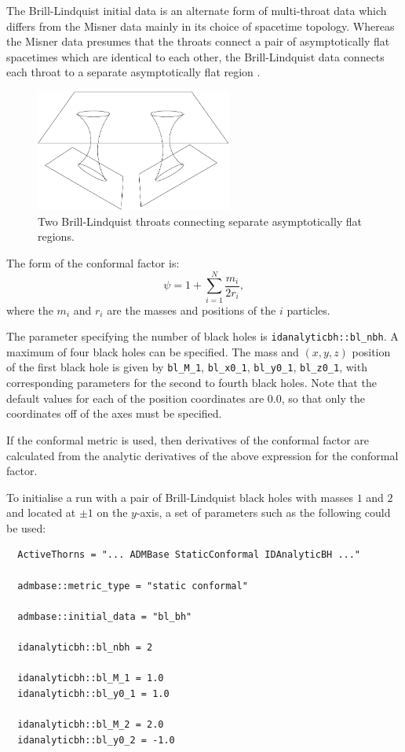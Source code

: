 \documentclass{article}
\begin{document}
The Brill-Lindquist initial data is an alternate form of multi-throat
data which differs from the Misner data mainly in its choice of
spacetime topology. Whereas the Misner data presumes that the throats
connect a pair of asymptotically flat spacetimes which are identical
to each other, the Brill-Lindquist data connects each throat to a
separate asymptotically flat region \cite{CactusEinstein_IDAnalyticBH_brill-lindquist:1963}.
\begin{figure}
  \centering
  \includegraphics[height=40mm]{brill_lindquist}
  \caption{Two Brill-Lindquist throats connecting separate
    asymptotically flat regions.}
\end{figure}
The form of the conformal factor is:
\begin{equation}
  \psi = 1 + \sum_{i=1}^N \frac{m_i}{2r_i},
\end{equation}
where the $m_i$ and $r_i$ are the masses and positions of the $i$
particles.

The parameter specifying the number of black holes is
\texttt{idanalyticbh::bl\_nbh}. A maximum of four black holes can be
specified. The mass and $(x,y,z)$ position of the first black hole is
given by \texttt{bl\_M\_1}, \texttt{bl\_x0\_1}, \texttt{bl\_y0\_1},
\texttt{bl\_z0\_1}, with corresponding parameters for the second to
fourth black holes. Note that the default values for each of the
position coordinates are $0.0$, so that only the coordinates off
of the axes must be specified.

If the conformal metric is used, then derivatives of the conformal
factor are calculated from the analytic derivatives of the above
expression for the conformal factor.

To initialise a run with a pair of Brill-Lindquist black holes with
masses $1$ and $2$ and located at $\pm 1$ on the $y$-axis, a set of
parameters such as the following could be used:
\begin{verbatim}
  ActiveThorns = "... ADMBase StaticConformal IDAnalyticBH ..."

  admbase::metric_type = "static conformal"

  admbase::initial_data = "bl_bh"

  idanalyticbh::bl_nbh = 2

  idanalyticbh::bl_M_1 = 1.0
  idanalyticbh::bl_y0_1 = 1.0

  idanalyticbh::bl_M_2 = 2.0
  idanalyticbh::bl_y0_2 = -1.0
\end{verbatim}
\end{document}
